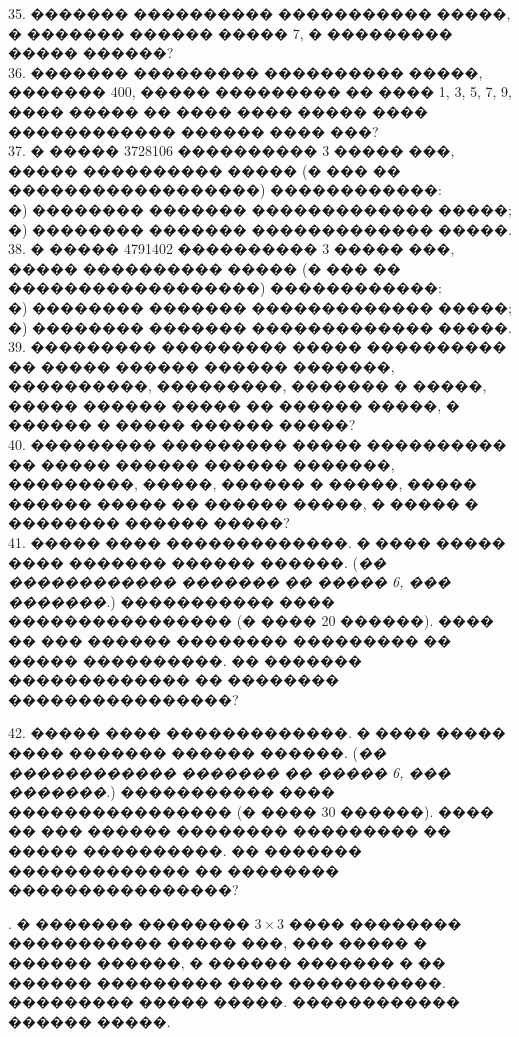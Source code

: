 \documentclass[12pt]{article}
\begin{document}
35. ������� ���������� ����������� �����, � ������� ������ ����� 7, � ��������� ����� ������?\\
36. ������� ��������� ���������� �����, ������� 400, ����� ��������� �� ���� 1, 3, 5, 7, 9, ���� ����� �� ���� ���� ����� ���� ������������ ������ ���� ���?\\
37. � ����� 3728106 ���������� 3 ����� ���, ����� ���������� ����� (� ��� �� ������������������) ������������:\\
�) �������� ������� ������������� �����;\\
�) �������� ������� ������������� �����.\\
38. � ����� 4791402 ���������� 3 ����� ���, ����� ���������� ����� (� ��� �� ������������������) ������������:\\
�) �������� ������� ������������� �����;\\
�) �������� ������� ������������� �����.\\
39. ��������� ��������� ����� ���������� �� ����� ������ ������ �������, ����������, ���������, ������� � �����, ����� ������ ����� �� ������ �����, � ������ � ����� ������ �����?\\
40. ��������� ��������� ����� ���������� �� ����� ������ ������ �������, ���������, �����, ������ � �����, ����� ������ ����� �� ������ �����, � ����� � �������� ������ �����?\\
41. ����� ���� �������������. � ���� ����� ���� ������� ������ ������. ({\it �� ������������ ������� �� ����� 6, ��� �������.}) ����������� ���� ���������������� (� ���� 20 ������). ���� �� ��� ������ �������� ��������� �� ����� ����������. �� ������� ������������� �� �������� ����������������?
\begin{center}
\begin{figure}[ht!]
\end{figure}
\end{center}
42. ����� ���� �������������. � ���� ����� ���� ������� ������ ������. ({\it �� ������������ ������� �� ����� 6, ��� �������.}) ����������� ���� ���������������� (� ���� 30 ������). ���� �� ��� ������ �������� ��������� �� ����� ����������. �� ������� ������������� �� �������� ����������������?
\begin{center}
\begin{figure}[ht!]
\end{figure}
\end{center}
\newpage
{}. � ������� �������� $3\times3$ ���� �������� ����������� ����� ���, ��� ����� � ������ ������, � ������ ������� � �� ������ ��������� ���� �����������. ��������� ����� �����. ������������ ������ �����.
\end{document}

